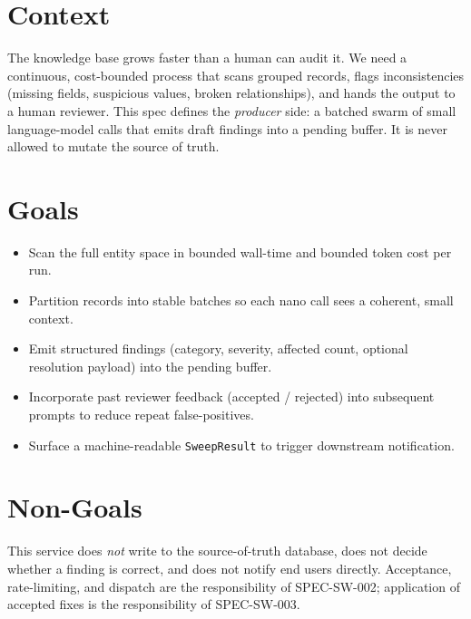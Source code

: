 



\makespecheader

\section{Context}
The knowledge base grows faster than a human can audit it. We need a continuous, cost-bounded process that scans grouped records, flags inconsistencies (missing fields, suspicious values, broken relationships), and hands the output to a human reviewer. This spec defines the \emph{producer} side: a batched swarm of small language-model calls that emits draft findings into a pending buffer. It is never allowed to mutate the source of truth.

\section{Goals}
\begin{itemize}[leftmargin=1.2em]
  \item Scan the full entity space in bounded wall-time and bounded token cost per run.
  \item Partition records into stable batches so each nano call sees a coherent, small context.
  \item Emit structured findings (category, severity, affected count, optional resolution payload) into the pending buffer.
  \item Incorporate past reviewer feedback (accepted / rejected) into subsequent prompts to reduce repeat false-positives.
  \item Surface a machine-readable \texttt{SweepResult} to trigger downstream notification.
\end{itemize}

\section{Non-Goals}
\begin{nongoal}
This service does \emph{not} write to the source-of-truth database, does not decide whether a finding is correct, and does not notify end users directly. Acceptance, rate-limiting, and dispatch are the responsibility of SPEC-SW-002; application of accepted fixes is the responsibility of SPEC-SW-003.
\end{nongoal}

